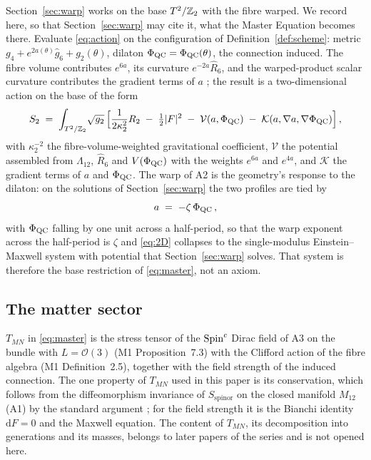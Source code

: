 Section~\ref{sec:warp} works on the base $T^2/\mathbb{Z}_2$ with the fibre warped. We record
here, so that Section~\ref{sec:warp} may cite it, what the Master Equation becomes
there. Evaluate \eqref{eq:action} on the configuration of
Definition~\ref{def:scheme}: metric $g_{4}+e^{2a(\theta)}\hat g_{6}+g_{2}(\theta)$,
dilaton $\Phi_{\mathrm{QC}}=\Phi_{\mathrm{QC}}(\theta)$, the connection induced. The fibre volume
contributes $e^{6a}$, its curvature $e^{-2a}\hat R_{6}$, and the
warped-product scalar curvature contributes the gradient terms of $a$
\cite[Ch.~7]{ONeill1983}; the result is a two-dimensional action on the
base of the form
\begin{equation}\label{eq:2D}
  S_{2}\;=\;\int_{T^2/\mathbb{Z}_2}\!\sqrt{g_{2}}\,
  \Bigl[\frac{1}{2\kappa_{2}^{2}}R_{2}\;-\;\tfrac12\lvert F\rvert^{2}
  \;-\;\mathcal{V}(a,\Phi_{\mathrm{QC}})\;-\;\mathcal{K}(a,\nabla a,\nabla\Phi_{\mathrm{QC}})\Bigr]\,,
\end{equation}
with $\kappa_{2}^{-2}$ the fibre-volume-weighted gravitational
coefficient, $\mathcal{V}$ the potential assembled from $\Lambda_{12}$,
$\hat R_{6}$ and $V(\Phi_{\mathrm{QC}})$ with the weights $e^{6a}$ and $e^{4a}$, and
$\mathcal{K}$ the gradient terms of $a$ and $\Phi_{\mathrm{QC}}$. The warp of A2 is the
geometry's response to the dilaton: on the solutions of Section~\ref{sec:warp} the two
profiles are tied by
\begin{equation}\label{eq:a-Phi}
  a\;=\;-\zeta\,\Phi_{\mathrm{QC}}\,,
\end{equation}
with $\Phi_{\mathrm{QC}}$ falling by one unit across a half-period, so that the warp
exponent across the half-period is $\zeta$ and \eqref{eq:2D} collapses to
the single-modulus Einstein--Maxwell system with potential that Section~\ref{sec:warp}
solves. That system is therefore the base restriction of
\eqref{eq:master}, not an axiom. \rigD

\subsection{The matter sector}\label{sec:matter}

$T_{MN}$ in \eqref{eq:master} is the stress tensor of the $\text{Spin}^c$ Dirac
field of A3 on the bundle with $L=\mathcal{O}(3)$ (M1 Proposition~7.3) with
the Clifford action of the fibre algebra (M1 Definition~2.5), together
with the field strength of the induced connection. The one property of
$T_{MN}$ used in this paper is its conservation, which follows from the
diffeomorphism invariance of $S_{\mathrm{spinor}}$ on the closed manifold
$M_{12}$ (A1) by the standard argument \cite{Wald}; for the field strength
it is the Bianchi identity $\mathrm{d}F=0$ and the Maxwell equation. The
content of $T_{MN}$, its decomposition into generations and its masses,
belongs to later papers of the series and is not opened here. \rigD

